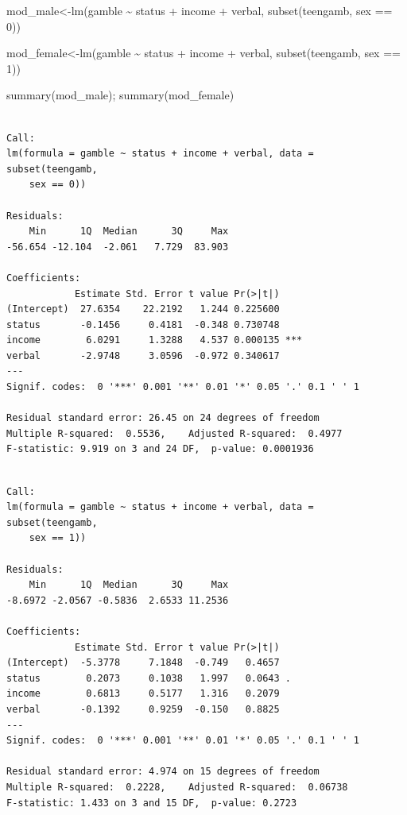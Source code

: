 \documentclass[
  letterpaper,
  DIV=11,
  numbers=noendperiod]{scrartcl}
\newenvironment{Shaded}{\begin{snugshade}}{\end{snugshade}}
\newcommand{\DecValTok}[1]{\textcolor[rgb]{0.68,0.00,0.00}{#1}}
\newcommand{\FunctionTok}[1]{\textcolor[rgb]{0.28,0.35,0.67}{#1}}
\newcommand{\NormalTok}[1]{\textcolor[rgb]{0.00,0.23,0.31}{#1}}
\newcommand{\OtherTok}[1]{\textcolor[rgb]{0.00,0.23,0.31}{#1}}
\newcommand{\SpecialCharTok}[1]{\textcolor[rgb]{0.37,0.37,0.37}{#1}}
\begin{document}
\begin{Shaded}
\begin{Highlighting}[]
\NormalTok{mod\_male}\OtherTok{\textless{}{-}}\FunctionTok{lm}\NormalTok{(gamble }\SpecialCharTok{\textasciitilde{}}\NormalTok{ status }\SpecialCharTok{+}\NormalTok{ income }\SpecialCharTok{+}\NormalTok{ verbal,}
             \FunctionTok{subset}\NormalTok{(teengamb, sex }\SpecialCharTok{==} \DecValTok{0}\NormalTok{))}

\NormalTok{mod\_female}\OtherTok{\textless{}{-}}\FunctionTok{lm}\NormalTok{(gamble }\SpecialCharTok{\textasciitilde{}}\NormalTok{ status }\SpecialCharTok{+}\NormalTok{ income }\SpecialCharTok{+}\NormalTok{ verbal,}
               \FunctionTok{subset}\NormalTok{(teengamb, sex }\SpecialCharTok{==} \DecValTok{1}\NormalTok{))}

\FunctionTok{summary}\NormalTok{(mod\_male); }\FunctionTok{summary}\NormalTok{(mod\_female)}
\end{Highlighting}
\end{Shaded}

\begin{verbatim}

Call:
lm(formula = gamble ~ status + income + verbal, data = subset(teengamb, 
    sex == 0))

Residuals:
    Min      1Q  Median      3Q     Max 
-56.654 -12.104  -2.061   7.729  83.903 

Coefficients:
            Estimate Std. Error t value Pr(>|t|)    
(Intercept)  27.6354    22.2192   1.244 0.225600    
status       -0.1456     0.4181  -0.348 0.730748    
income        6.0291     1.3288   4.537 0.000135 ***
verbal       -2.9748     3.0596  -0.972 0.340617    
---
Signif. codes:  0 '***' 0.001 '**' 0.01 '*' 0.05 '.' 0.1 ' ' 1

Residual standard error: 26.45 on 24 degrees of freedom
Multiple R-squared:  0.5536,    Adjusted R-squared:  0.4977 
F-statistic: 9.919 on 3 and 24 DF,  p-value: 0.0001936
\end{verbatim}

\begin{verbatim}

Call:
lm(formula = gamble ~ status + income + verbal, data = subset(teengamb, 
    sex == 1))

Residuals:
    Min      1Q  Median      3Q     Max 
-8.6972 -2.0567 -0.5836  2.6533 11.2536 

Coefficients:
            Estimate Std. Error t value Pr(>|t|)  
(Intercept)  -5.3778     7.1848  -0.749   0.4657  
status        0.2073     0.1038   1.997   0.0643 .
income        0.6813     0.5177   1.316   0.2079  
verbal       -0.1392     0.9259  -0.150   0.8825  
---
Signif. codes:  0 '***' 0.001 '**' 0.01 '*' 0.05 '.' 0.1 ' ' 1

Residual standard error: 4.974 on 15 degrees of freedom
Multiple R-squared:  0.2228,    Adjusted R-squared:  0.06738 
F-statistic: 1.433 on 3 and 15 DF,  p-value: 0.2723
\end{verbatim}
\end{document}

